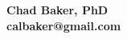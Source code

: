 \documentclass[11pt]{letter} %
\begin{document}

\begin{letter}{}


\begin{center}
\large\bf Chad Baker, PhD \\ %
calbaker@gmail.com %
\end{center} 
\vfill

\signature{Chad Baker} %



\end{letter}
\end{document}
